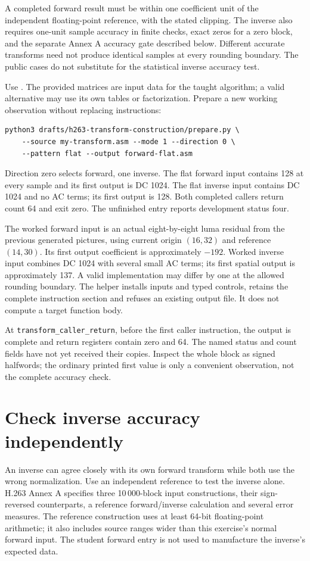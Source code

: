 A completed forward result must be within one coefficient unit of the independent
floating-point reference, with the stated clipping. The inverse also requires
one-unit sample accuracy in finite checks, exact zeros for a zero block, and the
separate Annex A accuracy gate described below. Different accurate transforms
need not produce identical samples at every rounding boundary. The public cases
do not substitute for the statistical inverse accuracy test.

Use . The provided matrices are
input data for the taught algorithm; a valid alternative may use its own tables
or factorization. Prepare a new working observation without replacing instructions:
\begin{verbatim}
python3 drafts/h263-transform-construction/prepare.py \
    --source my-transform.asm --mode 1 --direction 0 \
    --pattern flat --output forward-flat.asm
\end{verbatim}
Direction zero selects forward, one inverse. The flat forward input contains 128
at every sample and its first output is DC 1024. The flat inverse input contains
DC 1024 and no AC terms; its first output is 128. Both completed callers return
count 64 and exit zero. The unfinished entry reports development status four.

The worked forward input is an actual eight-by-eight luma residual from the
previous generated pictures, using current origin $(16,32)$ and reference
$(14,30)$. Its first output coefficient is approximately $-192$.
Worked inverse input combines DC 1024 with several small AC terms; its first
spatial output is approximately 137. A valid implementation may differ by one
at the allowed rounding boundary. The helper installs inputs and typed controls,
retains the complete instruction section and refuses an existing output file.
It does not compute a target function body.

At \texttt{transform\_caller\_return}, before the first caller instruction,
the output is complete and return registers contain zero and 64. The named
status and count fields have not yet received their copies. Inspect the whole
block as signed halfwords; the ordinary printed first value is only a convenient
observation, not the complete accuracy check.

\section{Check inverse accuracy independently}
An inverse can agree closely with its own forward transform while both use the
wrong normalization. Use an independent reference to test the inverse alone.
H.263 Annex A specifies three 10\,000-block input constructions, their sign-reversed
counterparts, a reference forward/inverse calculation and several error measures.
The reference construction uses at least 64-bit floating-point arithmetic; it
also includes source ranges wider than this exercise's normal forward input.
The student forward entry is not used to manufacture the inverse's expected data.


